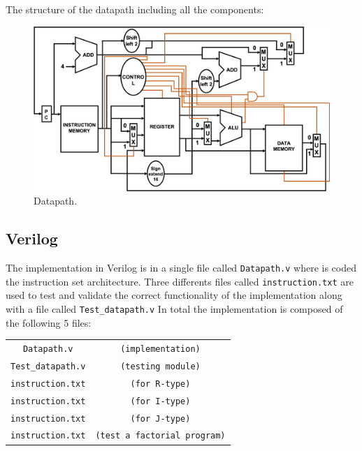 \documentclass[conference]{IEEEtran}
\begin{document}
The structure of the datapath including all the components:
\begin{figure}[h]
\includegraphics[scale=0.3]{MIPS_Datapath.png}
\caption{Datapath.}
\end{figure}

\subsection{Verilog}
The implementation in Verilog is in a single file called \verb$Datapath.v$ where is coded the instruction set architecture. Three differents files called \verb$instruction.txt$ are used to test and validate the correct functionality of the implementation along with a file called \verb$Test_datapath.v$
In total the implementation is composed of the following 5 files:

\begin{table}[htbp]
\begin{center}
\begin{tabular}{c c}
\verb$Datapath.v$&\verb$(implementation)$\\
\verb$Test_datapath.v$&\verb$(testing module)$\\
\verb$instruction.txt$&\verb$(for R-type)$\\
\verb$instruction.txt$&\verb$(for I-type)$\\
\verb$instruction.txt$&\verb$(for J-type)$\\
\verb$instruction.txt$&\verb$(test a factorial program)$\\
\end{tabular}
\end{center}
\end{table}
\end{document}
